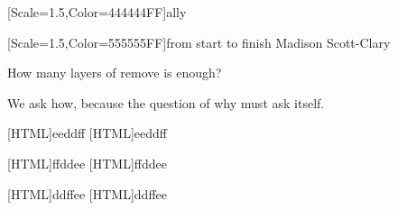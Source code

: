 \documentclass[11pt,onesided]{memoir}
\begin{document}
  \frontmatter

  
  

  \pagestyle{plain}

  \doublespacing

  \null
  \vfill
  \begin{flushright}
    {[Scale=1.5,Color=444444FF]\Huge ally}

    \vfill
    
    {[Scale=1.5,Color=555555FF]\normalsize from start to finish}
    \vfill
    {\Huge Madison Scott-Clary}
  \end{flushright}
  \thispagestyle{empty}

  \newpage

  

  \newpage
  \null
  \thispagestyle{empty}
  \cleardoublepage

  \onehalfspacing

  \null
  \vfill
  \begin{center}
    How many layers of remove is enough?

    \vfill

    We ask how, because the question of why must ask itself.
  \end{center}
  \vfill

  \mainmatter

  \pagestyle{ourbook}
  \setlength\columnsep{20pt}
  [HTML]{eeddff}
  [HTML]{eeddff}
  
  [HTML]{ffddee}
  [HTML]{ffddee}
  
  [HTML]{ddffee}
  [HTML]{ddffee}
  
  


  \backmatter
  \pagestyle{empty}
\end{document}
